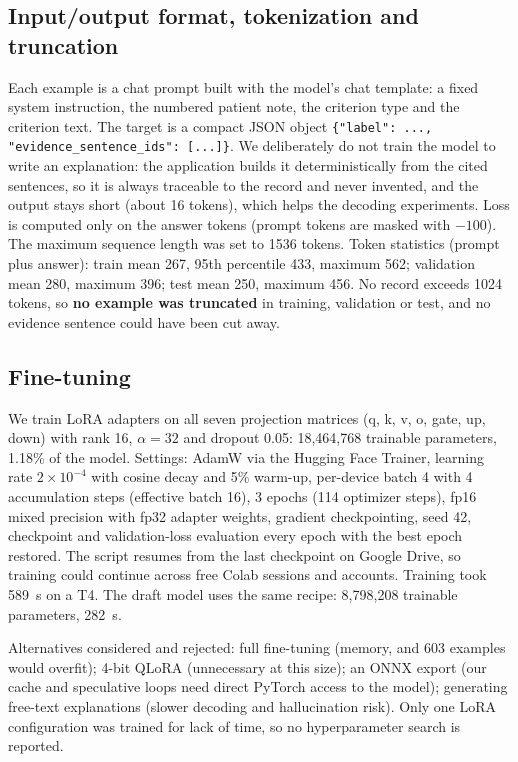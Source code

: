 \documentclass[conference]{IEEEtran}
\begin{document}
\subsection{Input/output format, tokenization and truncation}
Each example is a chat prompt built with the model's chat template: a fixed system instruction, the numbered patient note, the criterion type and the criterion text. The target is a compact JSON object \texttt{\{"label": ..., "evidence\_sentence\_ids": [...]\}}. We deliberately do not train the model to write an explanation: the application builds it deterministically from the cited sentences, so it is always traceable to the record and never invented, and the output stays short (about 16 tokens), which helps the decoding experiments. Loss is computed only on the answer tokens (prompt tokens are masked with $-100$). The maximum sequence length was set to 1536 tokens. Token statistics (prompt plus answer): train mean 267, 95th percentile 433, maximum 562; validation mean 280, maximum 396; test mean 250, maximum 456. No record exceeds 1024 tokens, so \textbf{no example was truncated} in training, validation or test, and no evidence sentence could have been cut away.

\subsection{Fine-tuning}
We train LoRA adapters on all seven projection matrices (q, k, v, o, gate, up, down) with rank 16, $\alpha=32$ and dropout 0.05: 18,464,768 trainable parameters, 1.18\% of the model. Settings: AdamW via the Hugging Face Trainer, learning rate $2\times10^{-4}$ with cosine decay and 5\% warm-up, per-device batch 4 with 4 accumulation steps (effective batch 16), 3 epochs (114 optimizer steps), fp16 mixed precision with fp32 adapter weights, gradient checkpointing, seed 42, checkpoint and validation-loss evaluation every epoch with the best epoch restored. The script resumes from the last checkpoint on Google Drive, so training could continue across free Colab sessions and accounts. Training took 589~s on a T4. The draft model uses the same recipe: 8,798,208 trainable parameters, 282~s.

Alternatives considered and rejected: full fine-tuning (memory, and 603 examples would overfit); 4-bit QLoRA (unnecessary at this size); an ONNX export (our cache and speculative loops need direct PyTorch access to the model); generating free-text explanations (slower decoding and hallucination risk). Only one LoRA configuration was trained for lack of time, so no hyperparameter search is reported.
\end{document}
